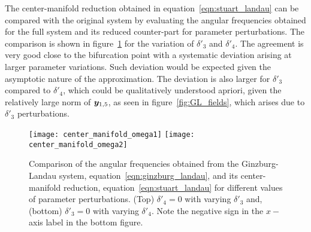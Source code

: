 The center-manifold reduction obtained in equation~\eqref{eqn:stuart_landau} can be compared with the original system by evaluating the angular frequencies obtained for the full system and its reduced counter-part for parameter perturbations. The comparison is shown in figure~\ref{fig:omega_parameter_variation} for the variation of $\delta'_{3}$ and $\delta'_{4}$. The agreement is very good close to the bifurcation point with a systematic deviation arising at larger parameter variations. Such deviation would be expected given the asymptotic nature of the approximation. The deviation is also larger for $\delta'_{3}$ compared to $\delta'_{4}$, which could be qualitatively understood apriori, given the relatively large norm of $\boldsymbol{y}_{1,5}$, as seen in figure~\ref{fig:GL_fields}, which arises due to $\delta'_{3}$ perturbations. 
\begin{figure}
	\centering
	\texttt{[image: center\_manifold\_omega1]}
	\texttt{[image: center\_manifold\_omega2]}
	\caption{Comparison of the angular frequencies obtained from the Ginzburg-Landau system, equation~\eqref{eqn:ginzburg_landau}, and its center-manifold reduction, equation~\eqref{eqn:stuart_landau} for different values of parameter perturbations. (Top) $\delta'_{4} = 0$ with varying $\delta'_{3}$ and, (bottom) $\delta'_{3} = 0$ with varying $\delta'_{4}$. Note the negative sign in the $x-$axis label in the bottom figure.}
	\label{fig:omega_parameter_variation}
\end{figure} 



